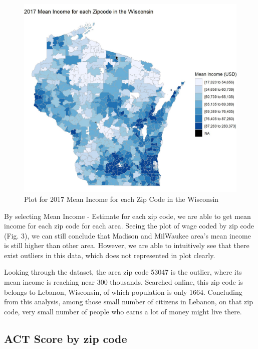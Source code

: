 \documentclass[letterpaper, 10 pt, conference]{ieeeconf}  %
\begin{document}
\begin{figure}
\begin{center}
\includegraphics[width=1.0\linewidth]{2017_Mean_Income_Zipcode.jpg}
\end{center}
\caption{Plot for 2017 Mean Income for each Zip Code in the Wisconsin}
\label{fig:long}
\label{fig:onecol}
\end{figure}

By selecting Mean Income - Estimate for each zip code, we are able to get mean income for each zip code for each area.
Seeing the plot of wage coded by zip code (Fig. 3), we can still conclude that Madison and MilWaukee area's mean income is still higher than other area.
However, we are able to intuitively see that there exist outliers in this data, which does not represented in plot clearly.

Looking through the dataset, the area zip code 53047 is the outlier, where its mean income is reaching near 300 thousands.
Searched online, this zip code is belongs to Lebanon, Wisconsin, of which population is only 1664.
Concluding from this analysis, among those small number of citizens in Lebanon, on that zip code, very small number of people who earns a lot of money might live there.


\subsection{ACT Score by zip code}
\end{document}
